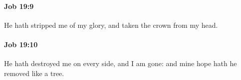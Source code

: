 		\paragraph{Job 19:9} %
			\label{JOB-19-9}

			He hath stripped me of my glory, and taken the crown from my head.


		\paragraph{Job 19:10} %
			\label{JOB-19-10}

			He hath destroyed me on every side, and I am gone: and mine hope hath he removed like a tree.


